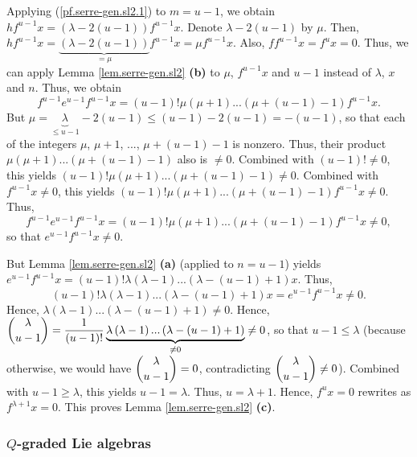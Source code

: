 \documentclass[etingof-lie.tex]{subfiles}
\begin{document}
Applying (\ref{pf.serre-gen.sl2.1}) to $m=u-1$, we obtain $hf^{u-1}x=\left(
\lambda-2\left(  u-1\right)  \right)  f^{u-1}x$. Denote $\lambda-2\left(
u-1\right)  $ by $\mu$. Then, $hf^{u-1}x=\underbrace{\left(  \lambda-2\left(
u-1\right)  \right)  }_{=\mu}f^{u-1}x=\mu f^{u-1}x$. Also, $ff^{u-1}%
x=f^{u}x=0$. Thus, we can apply Lemma \ref{lem.serre-gen.sl2} \textbf{(b)} to
$\mu$, $f^{u-1}x$ and $u-1$ instead of $\lambda$, $x$ and $n$. Thus, we obtain%
\[
f^{u-1}e^{u-1}f^{u-1}x=\left(  u-1\right)  !\mu\left(  \mu+1\right)
...\left(  \mu+\left(  u-1\right)  -1\right)  f^{u-1}x.
\]
But $\mu=\underbrace{\lambda}_{\leq u-1}-2\left(  u-1\right)  \leq\left(
u-1\right)  -2\left(  u-1\right)  =-\left(  u-1\right)  $, so that each of the
integers $\mu$, $\mu+1$, $...$, $\mu+\left(  u-1\right)  -1$ is nonzero. Thus,
their product $\mu\left(  \mu+1\right)  ...\left(  \mu+\left(  u-1\right)
-1\right)  $ also is $\neq0$. Combined with $\left(  u-1\right)  !\neq0$, this
yields $\left(  u-1\right)  !\mu\left(  \mu+1\right)  ...\left(  \mu+\left(
u-1\right)  -1\right)  \neq0$. Combined with $f^{u-1}x\neq0$, this yields
$\left(  u-1\right)  !\mu\left(  \mu+1\right)  ...\left(  \mu+\left(
u-1\right)  -1\right)  f^{u-1}x\neq0$. Thus,%
\[
f^{u-1}e^{u-1}f^{u-1}x=\left(  u-1\right)  !\mu\left(  \mu+1\right)
...\left(  \mu+\left(  u-1\right)  -1\right)  f^{u-1}x\neq0,
\]
so that $e^{u-1}f^{u-1}x\neq0$.

But Lemma \ref{lem.serre-gen.sl2} \textbf{(a)} (applied to $n=u-1$) yields
$e^{u-1}f^{u-1}x=\left(  u-1\right)  !\lambda\left(  \lambda-1\right)
...\left(  \lambda-\left(  u-1\right)  +1\right)  x$. Thus,
\[
\left(  u-1\right)  !\lambda\left(  \lambda-1\right)  ...\left(
\lambda-\left(  u-1\right)  +1\right)  x=e^{u-1}f^{u-1}x\neq0.
\]
Hence, $\lambda\left(  \lambda-1\right)  ...\left(  \lambda-\left(
u-1\right)  +1\right)  \neq0$. Hence, $\dbinom{\lambda}{u-1}=\dfrac{1}{\left(
u-1\right)  !}\underbrace{\lambda\left(  \lambda-1\right)  ...\left(
\lambda-\left(  u-1\right)  +1\right)  }_{\neq0}\neq0$, so that $u-1\leq
\lambda$ (because otherwise, we would have $\dbinom{\lambda}{u-1}=0$,
contradicting $\dbinom{\lambda}{u-1}\neq0$). Combined with $u-1\geq\lambda$,
this yields $u-1=\lambda$. Thus, $u=\lambda+1$. Hence, $f^{u}x=0$ rewrites as
$f^{\lambda+1}x=0$. This proves Lemma \ref{lem.serre-gen.sl2} \textbf{(c)}.

\subsubsection{\texorpdfstring{$Q$}{Q}-graded Lie algebras}
\end{document}
